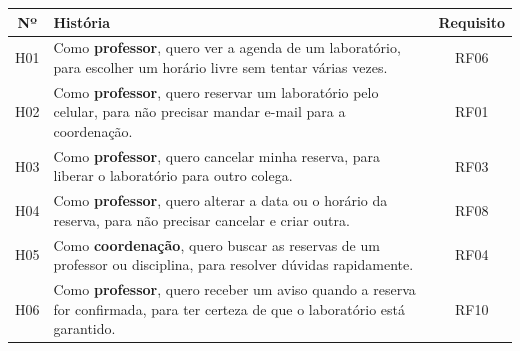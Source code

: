 \documentclass[a4paper,12pt]{article}
\begin{document}
\begin{xltabular}{\linewidth}{|c|Y|c|}
  \hline
  \textbf{Nº} & \textbf{História} & \textbf{Requisito} \\ \hline
  H01 & Como \textbf{professor}, quero ver a agenda de um laboratório, para escolher um horário livre sem tentar várias vezes. & RF06 \\ \hline
  H02 & Como \textbf{professor}, quero reservar um laboratório pelo celular, para não precisar mandar e-mail para a coordenação. & RF01 \\ \hline
  H03 & Como \textbf{professor}, quero cancelar minha reserva, para liberar o laboratório para outro colega. & RF03 \\ \hline
  H04 & Como \textbf{professor}, quero alterar a data ou o horário da reserva, para não precisar cancelar e criar outra. & RF08 \\ \hline
  H05 & Como \textbf{coordenação}, quero buscar as reservas de um professor ou disciplina, para resolver dúvidas rapidamente. & RF04 \\ \hline
  H06 & Como \textbf{professor}, quero receber um aviso quando a reserva for confirmada, para ter certeza de que o laboratório está garantido. & RF10 \\ \hline
\end{xltabular}
\end{document}
